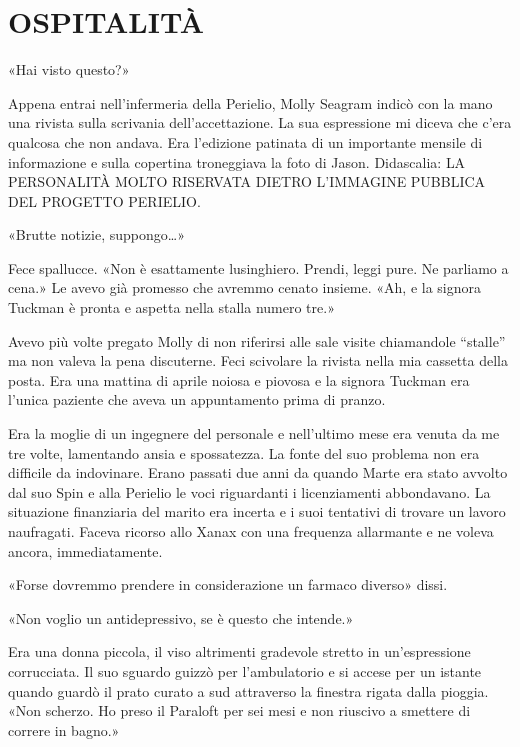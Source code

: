 \chapter{OSPITALITÀ}\label{ospitalità}

\hfill\break

«Hai visto questo?»

Appena entrai nell'infermeria della Perielio, Molly Seagram indicò con
la mano una rivista sulla scrivania dell'accettazione. La sua
espressione mi diceva che c'era qualcosa che non andava. Era l'edizione
patinata di un importante mensile di informazione e sulla copertina
troneggiava la foto di Jason. Didascalia: {LA PERSONALITÀ MOLTO
	RISERVATA DIETRO L'IMMAGINE PUBBLICA DEL PROGETTO PERIELIO}.

«Brutte notizie, suppongo\ldots»

Fece spallucce. «Non è esattamente lusinghiero. Prendi, leggi pure. Ne
parliamo a cena.» Le avevo già promesso che avremmo cenato insieme. «Ah,
e la signora Tuckman è pronta e aspetta nella stalla numero tre.»

Avevo più volte pregato Molly di non riferirsi alle sale visite
chiamandole ``stalle'' ma non valeva la pena discuterne. Feci scivolare
la rivista nella mia cassetta della posta. Era una mattina di aprile
noiosa e piovosa e la signora Tuckman era l'unica paziente che aveva un
appuntamento prima di pranzo.

Era la moglie di un ingegnere del personale e nell'ultimo mese era
venuta da me tre volte, lamentando ansia e spossatezza. La fonte del suo
problema non era difficile da indovinare. Erano passati due anni da
quando Marte era stato avvolto dal suo Spin e alla Perielio le voci
riguardanti i licenziamenti abbondavano. La situazione finanziaria del
marito era incerta e i suoi tentativi di trovare un lavoro naufragati.
Faceva ricorso allo Xanax con una frequenza allarmante e ne voleva
ancora, immediatamente.

«Forse dovremmo prendere in considerazione un farmaco diverso» dissi.

«Non voglio un antidepressivo, se è questo che intende.»

Era una donna piccola, il viso altrimenti gradevole stretto in
un'espressione corrucciata. Il suo sguardo guizzò per l'ambulatorio e si
accese per un istante quando guardò il prato curato a sud attraverso la
finestra rigata dalla pioggia. «Non scherzo. Ho preso il Paraloft per
sei mesi e non riuscivo a smettere di correre in bagno.»

